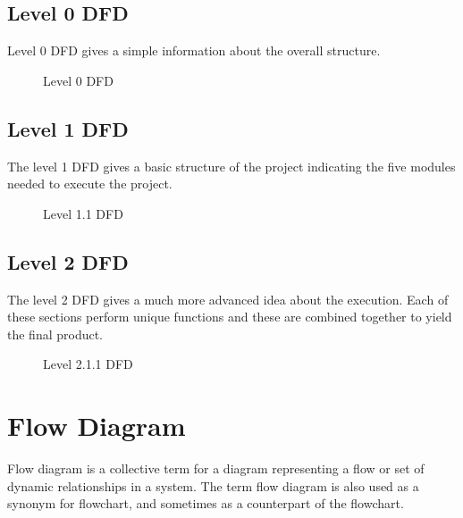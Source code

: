 \documentclass[12pt,a4paper,oneside]{report}
\begin{document}
{\newpage
\subsection{Level 0 DFD}
Level 0 DFD gives a simple information about the overall structure. 
\begin{figure}[h!]
\begin{center}

\hspace{1 in}
\caption{Level 0 DFD}
\end{center}
\end{figure}

\subsection{Level 1 DFD}
The level 1 DFD gives a basic structure of the project indicating the five modules needed to execute the project.
\newpage
\begin{figure}[h]
\begin{center}
\hspace{1 in}
\caption{Level 1.1 DFD}
\end{center}
\vspace{-1.5 in}
\end{figure}

\vspace{100pt}
\subsection{Level 2 DFD}
The level 2 DFD gives a much more advanced idea about the execution. Each of these sections perform unique functions and these are combined together to yield the final product.
\begin{figure}[h]
\begin{center}
\vspace{0.5 in}
\hspace{.0 in}
\caption{Level 2.1.1 DFD}
\end{center}

\end{figure}
\pagebreak

\section{Flow Diagram}
Flow diagram is a collective term for a diagram representing a flow or set of dynamic relationships in a system. The term flow diagram is also used as a synonym for flowchart, and sometimes as a counterpart of the flowchart.

}
\end{document}
